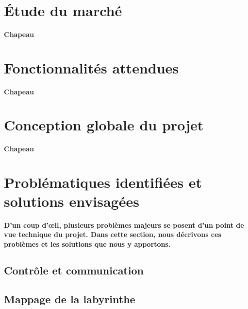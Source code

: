 \section{Étude du marché} \label{sec:etudeMarche}

\paragraph{Chapeau}


\section{Fonctionnalités attendues} \label{sec:foncAttendues}

\paragraph{Chapeau}


\section{Conception globale du projet} \label{sec:conception}

\paragraph{Chapeau}


\section{Problématiques identifiées et solutions envisagées} \label{sec:problemesSolutions}

\paragraph{
D'un coup d'œil, plusieurs problèmes majeurs se posent d'un point de vue technique du projet.
Dans cette section, nous décrivons ces problèmes et les solutions que nous y apportons.
}

\subsection{Contrôle et communication}
\paragraph{
}

\subsection{Mappage de la labyrinthe}
